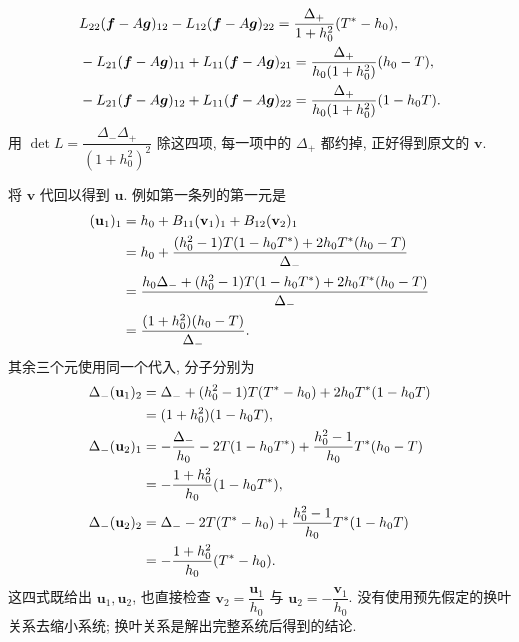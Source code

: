 \begin{equation*}
\begin{aligned}
&L_{22}(\boldsymbol f- A\boldsymbol g)_{12}
-L_{12}(\boldsymbol f- A\boldsymbol g)_{22}
=\dfrac{\Delta_+}{1+h_0^2}({T}^{*}-h_0),\\
&-L_{21}(\boldsymbol f- A\boldsymbol g)_{11}
+L_{11}(\boldsymbol f- A\boldsymbol g)_{21}
=\dfrac{\Delta_+}{h_0(1+h_0^2)}(h_0-T),\\
&-L_{21}(\boldsymbol f- A\boldsymbol g)_{12}
+L_{11}(\boldsymbol f- A\boldsymbol g)_{22}
=\dfrac{\Delta_+}{h_0(1+h_0^2)}(1-h_0T).
\end{aligned}
\end{equation*}
用 $\det L=\dfrac{\Delta_-\Delta_+}{(1+h_0^2)^2}$ 除这四项,
每一项中的 $\Delta_+$ 都约掉, 正好得到原文的 $\boldsymbol v$.

\par\smallskip\noindent 将 $\boldsymbol v$ 代回以得到 $\boldsymbol u$.\quad
例如第一条列的第一元是
\begin{equation*}
\begin{aligned}
(\mathbf u_1)_1
&=h_0+ B_{11}(\mathbf v_1)_1
+ B_{12}(\mathbf v_2)_1\\
&=h_0+\dfrac{(h_0^2-1)T(1-h_0{T}^{*})
+2h_0{T}^{*}(h_0-T)}{\Delta_-}\\
&=\dfrac{h_0\Delta_-+(h_0^2-1)T(1-h_0{T}^{*})
+2h_0{T}^{*}(h_0-T)}{\Delta_-}\\
&=\dfrac{(1+h_0^2)(h_0-T)}{\Delta_-}.
\end{aligned}
\end{equation*}
其余三个元使用同一个代入, 分子分别为
\begin{equation*}
\begin{aligned}
\Delta_-(\mathbf u_1)_2
&=\Delta_-+(h_0^2-1)T({T}^{*}-h_0)
+2h_0{T}^{*}(1-h_0T)\\
&=(1+h_0^2)(1-h_0T),\\
\Delta_-(\mathbf u_2)_1
&=-\dfrac{\Delta_-}{h_0}-2T(1-h_0{T}^{*})
+\dfrac{h_0^2-1}{h_0}{T}^{*}(h_0-T)\\
&=-\dfrac{1+h_0^2}{h_0}(1-h_0{T}^{*}),\\
\Delta_-(\mathbf u_2)_2
&=\Delta_--2T({T}^{*}-h_0)
+\dfrac{h_0^2-1}{h_0}{T}^{*}(1-h_0T)\\
&=-\dfrac{1+h_0^2}{h_0}({T}^{*}-h_0).
\end{aligned}
\end{equation*}
这四式既给出 $\mathbf u_1,\mathbf u_2$, 也直接检查
$\mathbf v_2=\dfrac{\mathbf u_1}{h_0}$ 与 $\mathbf u_2=-\dfrac{\mathbf v_1}{h_0}$.
没有使用预先假定的换叶关系去缩小系统;
换叶关系是解出完整系统后得到的结论.


